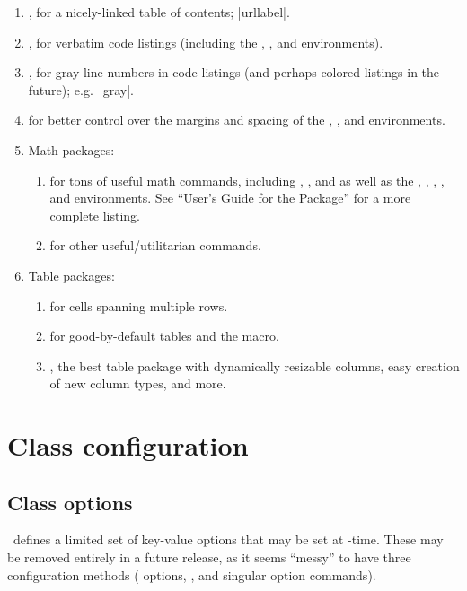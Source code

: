 \documentclass{ltxdoc}
\begin{document}
\begin{enumerate}
\item {}, for a nicely-linked table of contents;
	|{url}{label}|.
\item {}, for verbatim code listings (including the
	, , and  environments).
\item {}, for gray line numbers in code listings (and perhaps
	colored listings in the future); e.g.\ |{gray}|.
\item {} for better control over the margins and spacing of
	the , , and 
	environments.
\item Math packages: \begin{enumerate}
	\item {} for tons of useful math commands, including
		, , and  as well as the ,
		, , , and
		 environments. See
		\href{http://texdoc.net/texmf-dist/doc/latex/amsmath/amsldoc.pdf}{``User's
		Guide for the  Package''} for a more
		complete listing.
	\item {} for other useful/utilitarian commands.
\end{enumerate}
\item Table packages: \begin{enumerate}
	\item {} for cells spanning multiple rows.
	\item {} for good-by-default tables and the 
		macro.
	\item {}, the best table package with dynamically resizable
		columns, easy creation of new column types, and more.
\end{enumerate}
\end{enumerate}

\section{Class configuration}

\subsection{Class options}

\bps\ defines a limited set of key-value options that may be set at
-time. These may be removed entirely in a future release,
as it seems ``messy'' to have three configuration methods
( options, , and singular option
commands).
\end{document}
